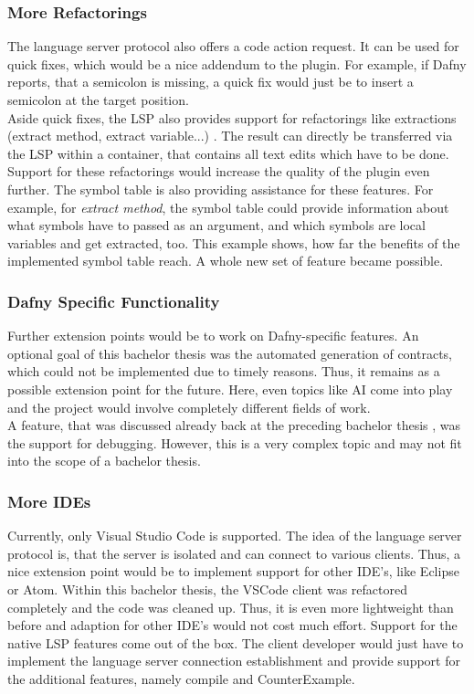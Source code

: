 \subsubsection{More Refactorings}
The language server protocol also offers a code action request.
It can be used for quick fixes, which would be a nice addendum to the plugin.
For example, if Dafny reports, that a semicolon is missing, a quick fix would just be to insert a semicolon at the target position.\\

Aside quick fixes, the LSP also provides support for refactorings like extractions (extract method, extract variable...) \cite{lspspec}.
The result can directly be transferred via the LSP within a  container, that contains all text edits which have to be done.
Support for these refactorings would increase the quality of the plugin even further.
The symbol table is also providing assistance for these features.
For example, for \textit{extract method}, the symbol table could provide information about what symbols have to passed as an argument, and which symbols are local variables and get extracted, too.
This example shows, how far the benefits of the implemented symbol table reach.
A whole new set of feature became possible.

\subsubsection{Dafny Specific Functionality}
Further extension points would be to work on Dafny-specific features.
An optional goal of this bachelor thesis was the automated generation of contracts, which could not be implemented due to timely reasons.
Thus, it remains as a possible extension point for the future.
Here, even topics like AI come into play and the project would involve completely different fields of work.\\

A feature, that was discussed already back at the preceding bachelor thesis \cite{ba}, was the support for debugging.
However, this is a very complex topic and may not fit into the scope of a bachelor thesis.

\subsubsection{More IDEs}
Currently, only Visual Studio Code is supported.
The idea of the language server protocol is, that the server is isolated and can connect to various clients.
Thus, a nice extension point would be to implement support for other IDE's, like Eclipse or Atom.
Within this bachelor thesis, the VSCode client was refactored completely and the code was cleaned up.
Thus, it is even more lightweight than before and adaption for other IDE's would not cost much effort.
Support for the native LSP features come out of the box.
The client developer would just have to implement the language server connection establishment and provide support for the additional features, namely compile and CounterExample.

